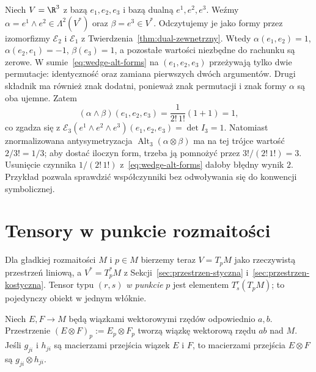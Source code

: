 \begin{przyklad}
\label{prz:normalizacja-wedge-form}
Niech $V=\R^3$ z bazą $e_1,e_2,e_3$ i bazą dualną
$e^1,e^2,e^3$. Weźmy
$\alpha=e^1\wedge e^2\in\Lambda^2(V^*)$
oraz $\beta=e^3\in V^*$.
Odczytujemy je jako formy przez izomorfizmy
$\mathcal E_2$ i $\mathcal E_1$ z
Twierdzenia~\ref{thm:dual-zewnetrzny}.
Wtedy $\alpha(e_1,e_2)=1$,
$\alpha(e_2,e_1)=-1$, $\beta(e_3)=1$,
a pozostałe wartości niezbędne do rachunku są zerowe.
W sumie~\eqref{eq:wedge-alt-forms} na
$(e_1,e_2,e_3)$ przeżywają tylko dwie permutacje:
identyczność oraz zamiana pierwszych dwóch argumentów.
Drugi składnik ma również znak dodatni, ponieważ
znak permutacji i znak formy $\alpha$ są oba ujemne.
Zatem
\[
 (\alpha\wedge\beta)(e_1,e_2,e_3)
 =\frac{1}{2!\,1!}(1+1)=1,
\]
co zgadza się z
$\mathcal E_3(e^1\wedge e^2\wedge e^3)(e_1,e_2,e_3)
=\det I_3=1$.
Natomiast znormalizowana antysymetryzacja
$\operatorname{Alt}_3(\alpha\otimes\beta)$
ma na tej trójce wartość $2/3!=1/3$;
aby dostać iloczyn form, trzeba ją pomnożyć przez
$3!/(2!\,1!)=3$. Usunięcie czynnika
$1/(2!\,1!)$ z~\eqref{eq:wedge-alt-forms}
dałoby błędny wynik $2$.
Przykład pozwala sprawdzić współczynniki bez
odwoływania się do konwencji symbolicznej.
\end{przyklad}

\section{Tensory w punkcie rozmaitości}
\label{sec:tensory-rozmaitosc}

Dla gładkiej rozmaitości $M$ i $p\in M$ bierzemy teraz
$V=T_pM$ jako rzeczywistą przestrzeń liniową, a
$V^*=T_p^*M$ z Sekcji~\ref{sec:przestrzen-styczna}
i~\ref{sec:przestrzen-kostyczna}. Tensor typu $(r,s)$
\emph{w punkcie} $p$ jest elementem $T^r_s(T_pM)$;
to pojedynczy obiekt w jednym włóknie.

\begin{stwierdzenie}
\label{prop:tensor-wiazek}
Niech $E,F\to M$ będą wiązkami wektorowymi rzędów
odpowiednio $a,b$. Przestrzenie $(E\otimes F)_p:=E_p\otimes F_p$
tworzą wiązkę wektorową rzędu $ab$ nad $M$. Jeśli
$g_{ji}$ i $h_{ji}$ są macierzami przejścia wiązek
$E$ i $F$, to macierzami przejścia $E\otimes F$
są $g_{ji}\otimes h_{ji}$.
\end{stwierdzenie}

